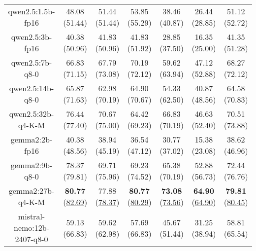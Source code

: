 \begin{table}[hbp]
{\begin{tabular}{ccccccc}
        \multicolumn{1}{c|}{qwen2.5:1.5b-fp16} & 48.08 (51.44) & 51.44 (51.44) & \multicolumn{1}{c|}{53.85 (55.29)} & 38.46 (40.87) & \multicolumn{1}{c|}{26.44 (28.85)} & 51.12 (52.72) \\
        

        \multicolumn{1}{c|}{qwen2.5:3b-fp16} & 40.38 (50.96) & 41.83 (50.96) & \multicolumn{1}{c|}{41.83 (51.92)} & 28.85 (37.50) & \multicolumn{1}{c|}{16.35 (25.00)} & 41.35 (51.28) \\
        

        \multicolumn{1}{c|}{qwen2.5:7b-q8-0} & 66.83 (71.15) & 67.79 (73.08) & \multicolumn{1}{c|}{70.19 (72.12)} & 59.62 (63.94) & \multicolumn{1}{c|}{47.12 (52.88)} & 68.27 (72.12) \\
        

        \multicolumn{1}{c|}{qwen2.5:14b-q8-0} & 65.87 (71.63) & 62.98 (70.19) & \multicolumn{1}{c|}{64.90 (70.67)} & 54.33 (62.50) & \multicolumn{1}{c|}{40.87 (48.56)} & 64.58 (70.83) \\
        

        \multicolumn{1}{c|}{qwen2.5:32b-q4-K-M} & 76.44 (77.40) & 70.67 (75.00) & \multicolumn{1}{c|}{64.42 (69.23)} & 66.83 (70.19) & \multicolumn{1}{c|}{46.63 (52.40)} & 70.51 (73.88) \\
        

        \multicolumn{1}{c|}{gemma2:2b-fp16} & 40.38 (48.56) & 38.94 (45.19) & \multicolumn{1}{c|}{36.54 (47.12)} & 30.77 (37.02) & \multicolumn{1}{c|}{15.38 (23.08)} & 38.62 (46.96) \\
        

        \multicolumn{1}{c|}{gemma2:9b-q8-0} & 78.37 (79.81) & 69.71 (75.96) & \multicolumn{1}{c|}{69.23 (74.52)} & 65.38 (70.19) & \multicolumn{1}{c|}{52.88 (56.73)} & 72.44 (76.76) \\
        

        \multicolumn{1}{c|}{gemma2:27b-q4-K-M} & \textbf{80.77} (\underline{82.69}) & 77.88 (\underline{78.37}) & \multicolumn{1}{c|}{\textbf{80.77} (\underline{80.29})} & \textbf{73.08} (\underline{73.56}) & \multicolumn{1}{c|}{\textbf{64.90} (\underline{64.90})} & \textbf{79.81} (\underline{80.45}) \\
        

        \multicolumn{1}{c|}{mistral-nemo:12b-2407-q8-0} & 59.13 (66.83) & 59.62 (62.98) & \multicolumn{1}{c|}{57.69 (66.83)} & 45.67 (51.44) & \multicolumn{1}{c|}{31.25 (38.94)} & 58.81 (65.54) \\
        

\end{tabular}}
\end{table}
